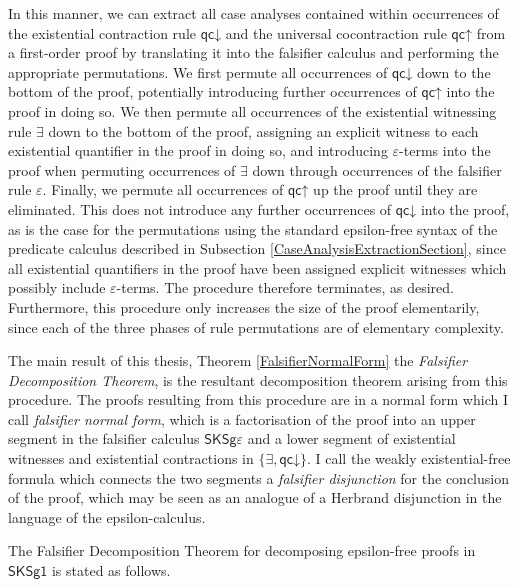 \documentclass[10pt]{article}
\theoremstyle{definition}\newtheorem{remark}[theorem]{Remark}
\theoremstyle{definition}\newtheorem{example}[theorem]{Example}
\theoremstyle{definition}\newtheorem{definition}[theorem]{Definition}
\newcommand{\SKSq}{{\mathsf{SKSg1}}}
\newcommand{\FalsifierCalculus}{{\mathsf{SKSg\varepsilon}}}
\newcommand{\qcUp}{{\mathsf{qc\mathord\uparrow}}}
\newcommand{\qcDown}{{\mathsf{qc\mathord\downarrow}}}
\newcommand{\falsifierRule}{{\mathsf{\varepsilon}}}
\begin{document}
	In this manner, we can extract all case analyses contained within occurrences of the existential contraction rule $\qcDown$ and the universal cocontraction rule $\qcUp$ from a first-order proof by translating it into the falsifier calculus and performing the appropriate permutations. We first permute all occurrences of $\qcDown$ down to the bottom of the proof, potentially introducing further occurrences of $\qcUp$ into the proof in doing so. We then permute all occurrences of the existential witnessing rule $\exists$ down to the bottom of the proof, assigning an explicit witness to each existential quantifier in the proof in doing so, and introducing $\varepsilon$-terms into the proof when permuting occurrences of $\exists$ down through occurrences of the falsifier rule $\falsifierRule$. Finally, we permute all occurrences of $\qcUp$ up the proof until they are eliminated. This does not introduce any further occurrences of $\qcDown$ into the proof, as is the case for the permutations using the standard epsilon-free syntax of the predicate calculus described in Subsection \ref{CaseAnalysisExtractionSection}, since all existential quantifiers in the proof have been assigned explicit witnesses which possibly include $\varepsilon$-terms. The procedure therefore terminates, as desired. Furthermore, this procedure only increases the size of the proof elementarily, since each of the three phases of rule permutations are of elementary complexity.
	
	The main result of this thesis, Theorem \ref{FalsifierNormalForm} the \textit{Falsifier Decomposition Theorem}, is the resultant decomposition theorem arising from this procedure. The proofs resulting from this procedure are in a normal form which I call \textit{falsifier normal form}, which is a factorisation of the proof into an upper segment in the falsifier calculus $\FalsifierCalculus$ and a lower segment of existential witnesses and existential contractions in $\{\exists, \qcDown\}$. I call the weakly existential-free formula which connects the two segments a \textit{falsifier disjunction} for the conclusion of the proof, which may be seen as an analogue of a Herbrand disjunction in the language of the epsilon-calculus.
	
	The Falsifier Decomposition Theorem for decomposing epsilon-free proofs in $\SKSq$ is stated as follows.
	
\end{document}
